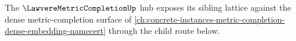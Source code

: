 The $\LawvereMetricCompletionUp$ hub exposes its sibling lattice against the dense metric-completion surface of \autoref{ch:concrete-instances-metric-completion-dense-embedding-namecert} through the child route below.



